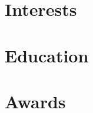 \documentclass[letterpaper]{twentysecondcv} %
\begin{document}

\aboutme{} %



\skills{}


\makeprofile %


\section{Interests}




\section{Education}

\begin{twenty} %
	
\end{twenty}


\section{Awards}
\end{document}
